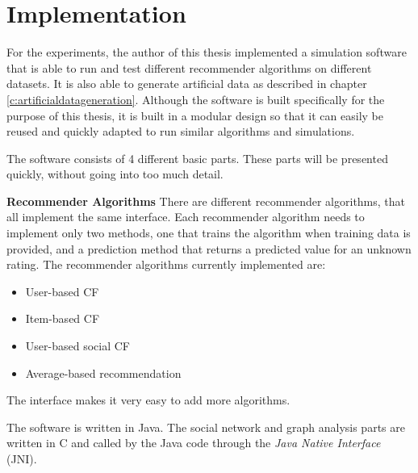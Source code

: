 \chapter{Implementation}
\label{c:implementation} For the experiments, the author of this thesis implemented a simulation software that is able to run and test different recommender algorithms on different datasets. It is also able to generate artificial data as described in chapter \ref{c:artificialdatageneration}. Although the software is built specifically for the purpose of this thesis, it is built in a modular design so that it can easily be reused and quickly adapted to run similar algorithms and simulations.
\newline

The software consists of 4 different basic parts. These parts will be presented quickly, without going into too much detail.
\newline

\textbf{Recommender Algorithms} There are different recommender algorithms, that all implement the same interface. Each recommender algorithm needs to implement only two methods, one that trains the algorithm when training data is provided, and a prediction method that returns a predicted value for an unknown rating. The recommender algorithms currently implemented are:

\begin{itemize}
\item User-based CF
\item Item-based CF
\item User-based social CF
\item Average-based recommendation
\end{itemize}

The interface makes it very easy to add more algorithms.
\newline


\newline

The software is written in Java. The social network and graph analysis parts are written in C and called by the Java code through the \textit{Java Native Interface} (JNI).